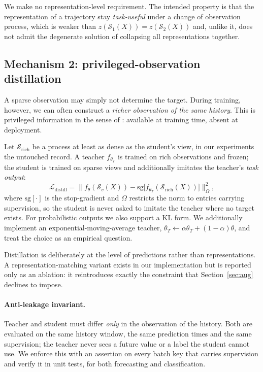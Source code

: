 \documentclass[sigconf,nonacm]{acmart}
\newcommand{\Sobs}{\mathcal{S}}
\begin{document}
We make no representation-level requirement. The intended property is that the representation of a trajectory
stay \emph{task-useful} under a change of observation process, which is weaker than
$z(\Sobs_1(X))=z(\Sobs_2(X))$ and, unlike it, does not admit the degenerate solution of collapsing all
representations together.

\subsection{Mechanism 2: privileged-observation distillation}
\label{sec:distill}
A sparse observation may simply not determine the target. During training, however, we can often construct a
\emph{richer observation of the same history}. This is privileged information in the sense of
\cite{vapnik2015lupi}: available at training time, absent at deployment.

Let $\Sobs_{\mathrm{rich}}$ be a process at least as dense as the student's view, in our experiments the
untouched record. A teacher $f_{\theta_T}$ is trained on rich observations and frozen; the student is trained on
sparse views and additionally imitates the teacher's \emph{task output}:
\begin{equation}
\mathcal{L}_{\mathrm{distill}}
=\big\| f_\theta(\Sobs_v(X))-\mathrm{sg}\big[f_{\theta_T}(\Sobs_{\mathrm{rich}}(X))\big] \big\|^2_{\Omega},
\label{eq:distill}
\end{equation}
where $\mathrm{sg}[\cdot]$ is the stop-gradient and $\Omega$ restricts the norm to entries carrying supervision,
so the student is never asked to imitate the teacher where no target exists. For probabilistic outputs we also
support a KL form. We additionally implement an exponential-moving-average teacher,
$\theta_T\leftarrow\alpha\theta_T+(1-\alpha)\theta$, and treat the choice as an empirical question.

Distillation is deliberately at the level of predictions rather than representations. A representation-matching
variant exists in our implementation but is reported only as an ablation: it reintroduces exactly the
constraint that Section~\ref{sec:aug} declines to impose.

\paragraph{Anti-leakage invariant.}
Teacher and student must differ \emph{only} in the observation of the history. Both are evaluated on the same
history window, the same prediction times and the same supervision; the teacher never sees a future value or a
label the student cannot use. We enforce this with an assertion on every batch key that carries supervision and
verify it in unit tests, for both forecasting and classification.
\end{document}
